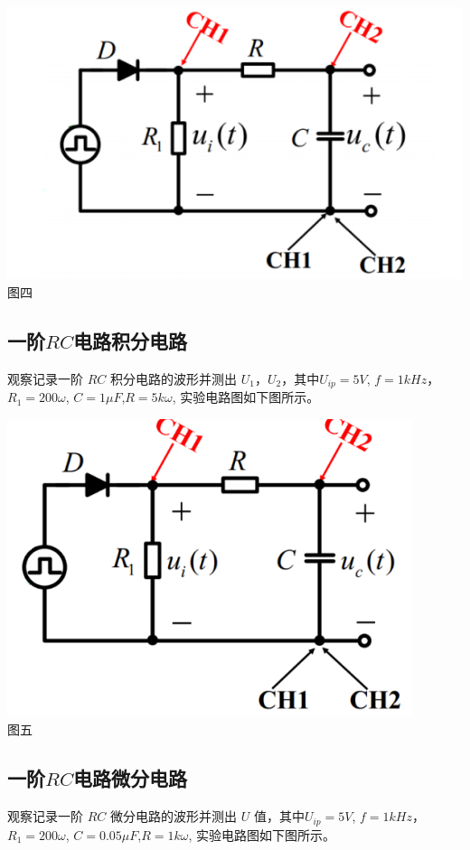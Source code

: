 \documentclass[a4paper]{article}
\begin{document}
    \begin{center}
        \includegraphics[scale=0.8]{4}\\
        {\small 图四}
    \end{center}

    \subsection{一阶$RC$电路积分电路}
    {观察记录一阶 $RC$ 积分电路的波形并测出 $U_{1}$，$U_{2}$，其中$U_{ip} = 5V$, $f = 1kHz$，$R_{1} = 200\omega$, $C =
    1\mu F$,$ R = 5k\omega$, 实验电路图如下图所示。}\label{subsec:$rc$5}

    \begin{center}
        \includegraphics[scale=0.8]{5}\\
        {\small 图五}
    \end{center}

    \subsection{一阶$RC$电路微分电路}
    {观察记录一阶 $RC$ 微分电路的波形并测出 $U$ 值，其中$U_{ip} = 5V$, $f = 1kHz$，$R_{1} = 200\omega$, $C =
    0.05\mu F$,$R = 1k\omega$, 实验电路图如下图所示。}\label{subsec:$rc$6}
\end{document}
